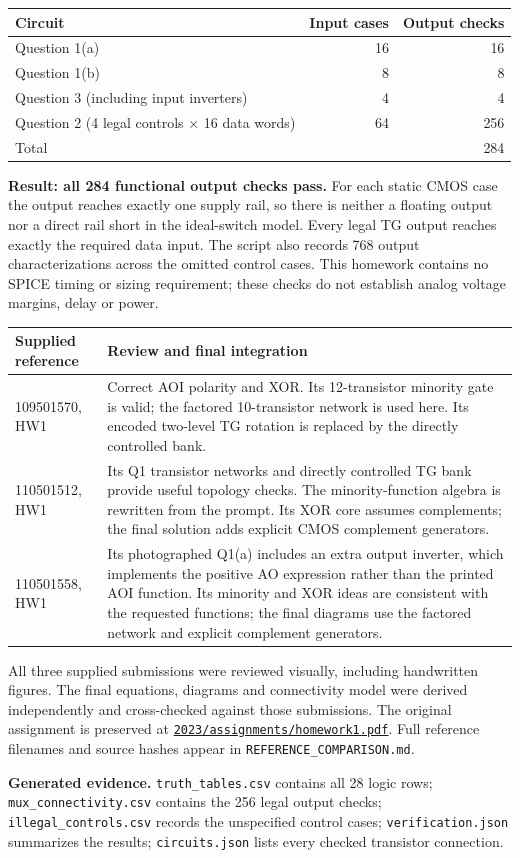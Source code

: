 \documentclass[11pt,a4paper]{article}
\begin{document}
\begin{center}
\begin{tabular}{lrr}\toprule
Circuit&Input cases&Output checks\\\midrule
Question 1(a)&16&16\\
Question 1(b)&8&8\\
Question 3 (including input inverters)&4&4\\
Question 2 (4 legal controls $\times$ 16 data words)&64&256\\\midrule
Total&&284\\\bottomrule
\end{tabular}
\end{center}
\textbf{Result: all 284 functional output checks pass.} For each static CMOS
case the output reaches exactly one supply rail, so there is neither a floating
output nor a direct rail short in the ideal-switch model. Every legal TG output
reaches exactly the required data input. The script also records 768 output
characterizations across the omitted control cases. This homework contains no
SPICE timing or sizing requirement; these checks do not establish analog
voltage margins, delay or power.

\begin{center}
\begin{tabular}{p{.21\linewidth}p{.70\linewidth}}\toprule
Supplied reference&Review and final integration\\\midrule
109501570, HW1&Correct AOI polarity and XOR. Its 12-transistor minority
gate is valid; the factored 10-transistor network is used here. Its encoded
two-level TG rotation is replaced by the directly controlled bank.\\[4pt]
110501512, HW1&Its Q1 transistor networks and directly controlled TG bank
provide useful topology checks. The minority-function algebra is rewritten
from the prompt. Its XOR core assumes complements; the final solution adds
explicit CMOS complement generators.\\[4pt]
110501558, HW1&Its photographed Q1(a) includes an extra output inverter,
which implements the positive AO expression rather than the printed AOI
function. Its minority and XOR ideas are consistent with the requested
functions; the final diagrams use the factored network and explicit
complement generators.\\\bottomrule
\end{tabular}
\end{center}
All three supplied submissions were reviewed visually, including handwritten
figures. The final equations, diagrams and connectivity model were derived
independently and cross-checked against those submissions. The original
assignment is preserved at
\href{../assignments/homework1.pdf}{\texttt{2023/assignments/homework1.pdf}}.
Full reference filenames and source hashes appear in
\texttt{REFERENCE\_COMPARISON.md}.

\textbf{Generated evidence.} \texttt{truth\_tables.csv} contains all 28 logic
rows; \texttt{mux\_connectivity.csv} contains the 256 legal output checks;
\texttt{illegal\_controls.csv} records the unspecified control cases;
\texttt{verification.json} summarizes the results;
\texttt{circuits.json} lists every checked transistor connection.
\end{document}
